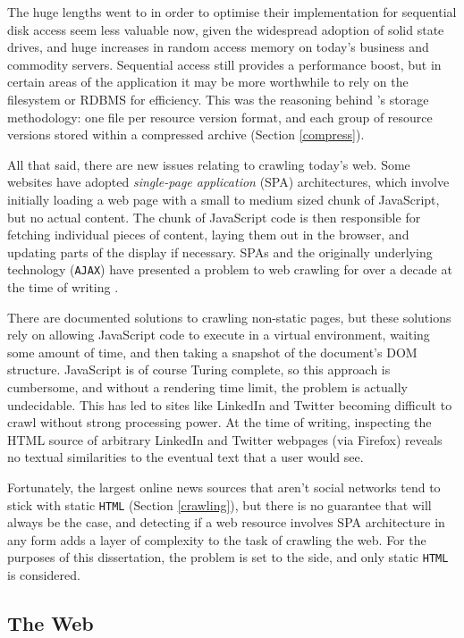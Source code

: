 The huge lengths  went to in order to optimise
their implementation for sequential disk
access seem less valuable now, given the widespread adoption of solid
state drives, and huge increases in random access memory on today's
business and commodity servers.  Sequential access still provides
a performance boost, but in certain areas of the application it may
be more worthwhile to rely on the filesystem or RDBMS for efficiency.  This was
the reasoning behind \nr{}'s storage methodology: one file per resource
version format, and each group of resource versions stored within a
compressed archive (Section \ref{compress}).

All that said, there are new issues relating to crawling today's web.
Some websites have adopted {\it single-page application} (SPA)
architectures, which involve initially loading a web page
with a small to medium sized chunk of JavaScript, but no
actual content.  The chunk of JavaScript code is then responsible
for fetching individual pieces of content, laying them out in
the browser, and updating parts of the display if necessary.
SPAs and the originally underlying technology ({\tt AJAX}) have
presented a problem to web crawling for over a decade at the time
of writing \cite{matter2008, mesbah2012}.

There are documented solutions to crawling non-static pages, but
these solutions rely on allowing JavaScript code to execute in
a virtual environment, waiting some amount of time, and
then taking a snapshot of the document's DOM structure.
JavaScript is of course Turing complete, so this approach is
cumbersome, and without a rendering time limit, the problem is
actually undecidable.  This has led to sites like LinkedIn and
Twitter becoming difficult to crawl without strong processing
power. At the time of writing, inspecting the HTML source of arbitrary
LinkedIn and Twitter webpages (via Firefox) reveals no textual
similarities to the eventual text that a user would see.

Fortunately, the largest online news sources that aren't social
networks tend to stick with static {\tt HTML} (Section \ref{crawling}),
but there is no
guarantee that will always be the case, and detecting if a web
resource involves SPA architecture in any form adds a layer of
complexity to the task of crawling the web.  For the purposes of
this dissertation, the problem is set to the side, and only static
{\tt HTML} is considered.

\subsection{The Web}

